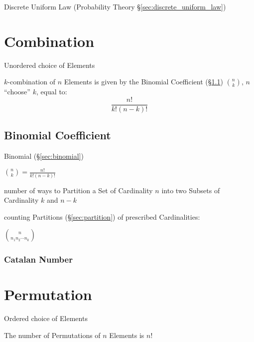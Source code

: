 \fist Discrete Uniform Law (Probability Theory \S\ref{sec:discrete_uniform_law})



\section{Combination}\label{sec:combination}

Unordered choice of Elements

$k$-combination of $n$ Elements is given by the Binomial Coefficient
(\S\ref{sec:binomial_coefficient}) $\binom{n}{k}$, $n$ ``choose'' $k$,
equal to:
\[
  \frac{n!}{k!(n - k)!}
\]



\subsection{Binomial Coefficient}\label{sec:binomial_coefficient}

Binomial (\S\ref{sec:binomial})

$\binom{n}{k} = \frac{n!}{k!(n - k)!}$

number of ways to Partition a Set of Cardinality $n$ into two Subsets of
Cardinality $k$ and $n-k$

counting Partitions (\S\ref{sec:partition}) of prescribed Cardinalities:

$\binom{n}{n_1 n_2 \cdots n_k}$



\subsubsection{Catalan Number}\label{sec:catalan_number}



\section{Permutation}\label{sec:permutation}

Ordered choice of Elements

The number of Permutations of $n$ Elements is $n!$

